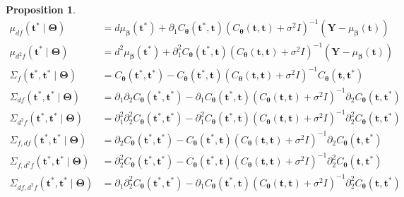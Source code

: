 \documentclass[
  11pt,
]{article}
\newtheorem{proposition}{Proposition}
\theoremstyle{nonumberplain}
\begin{document}
\begin{proposition}
\begin{align*}
  \mu_{df}(\mathbf{t}^\ast \mid \bm{\Theta}) &= d\mu_{\bm{\beta}}(\mathbf{t}^\ast) + \partial_1 C_{\bm{\theta}}(\mathbf{t}^\ast, \mathbf{t})\left(C_{\bm{\theta}}(\mathbf{t}, \mathbf{t}) + \sigma^2 I\right)^{-1}\left(\mathbf{Y} - \mu_{\bm{\beta}}(\mathbf{t})\right) \\
  \mu_{d^2\!f}(\mathbf{t}^\ast \mid \bm{\Theta}) &= d^2\!\mu_{\bm{\beta}}(\mathbf{t}^\ast) + \partial_1^2 C_{\bm{\theta}}(\mathbf{t}^\ast, \mathbf{t})\left(C_{\bm{\theta}}(\mathbf{t}, \mathbf{t}) + \sigma^2 I\right)^{-1}\left(\mathbf{Y} - \mu_{\bm{\beta}}(\mathbf{t})\right)\\
  \Sigma_{f}(\mathbf{t}^\ast, \mathbf{t}^\ast \mid \bm{\Theta}) &= C_{\bm{\theta}}(\mathbf{t}^\ast, \mathbf{t}^\ast) - C_{\bm{\theta}}(\mathbf{t}^\ast, \mathbf{t})\left(C_{\bm{\theta}}(\mathbf{t}, \mathbf{t}) + \sigma^2 I\right)^{-1} C_{\bm{\theta}}(\mathbf{t}, \mathbf{t}^\ast)\\
  \Sigma_{df}(\mathbf{t}^\ast, \mathbf{t}^\ast \mid \bm{\Theta}) &= \partial_1\partial_2C_{\bm{\theta}}(\mathbf{t}^\ast, \mathbf{t}^\ast) - \partial_1C_{\bm{\theta}}(\mathbf{t}^\ast, \mathbf{t})\left(C_{\bm{\theta}}(\mathbf{t}, \mathbf{t}) + \sigma^2 I\right)^{-1} \partial_2C_{\bm{\theta}}(\mathbf{t}, \mathbf{t}^\ast)\\
  \Sigma_{d^2\!f}(\mathbf{t}^\ast, \mathbf{t}^\ast \mid \bm{\Theta}) &= \partial_1^2\partial_2^2 C_{\bm{\theta}}(\mathbf{t}^\ast, \mathbf{t}^\ast) - \partial_1^2 C_{\bm{\theta}}(\mathbf{t}^\ast, \mathbf{t})\left(C_{\bm{\theta}}(\mathbf{t}, \mathbf{t}) + \sigma^2 I\right)^{-1} \partial_2^2 C_{\bm{\theta}}(\mathbf{t}, \mathbf{t}^\ast)\\
  \Sigma_{f, df}(\mathbf{t}^\ast, \mathbf{t}^\ast \mid \bm{\Theta}) &= \partial_2 C_{\bm{\theta}}(\mathbf{t}^\ast, \mathbf{t}^\ast) - C_{\bm{\theta}}(\mathbf{t}^\ast, \mathbf{t})\left(C_{\bm{\theta}}(\mathbf{t}, \mathbf{t}) + \sigma^2 I\right)^{-1} \partial_2 C_{\bm{\theta}}(\mathbf{t}, \mathbf{t}^\ast)\\
  \Sigma_{f, d^2\!f}(\mathbf{t}^\ast, \mathbf{t}^\ast \mid \bm{\Theta}) &= \partial_2^2 C_{\bm{\theta}}(\mathbf{t}^\ast, \mathbf{t}^\ast) - C_{\bm{\theta}}(\mathbf{t}^\ast, \mathbf{t})\left(C_{\bm{\theta}}(\mathbf{t}, \mathbf{t}) + \sigma^2 I\right)^{-1} \partial_2^2 C_{\bm{\theta}}(\mathbf{t}, \mathbf{t}^\ast)\\
  \Sigma_{df, d^2\!f}(\mathbf{t}^\ast, \mathbf{t}^\ast \mid \bm{\Theta}) &= \partial_1 \partial_2^2 C_{\bm{\theta}}(\mathbf{t}^\ast, \mathbf{t}^\ast) - \partial_1 C_{\bm{\theta}}(\mathbf{t}^\ast, \mathbf{t})\left(C_{\bm{\theta}}(\mathbf{t}, \mathbf{t}) + \sigma^2 I\right)^{-1} \partial_2^2 C_{\bm{\theta}}(\mathbf{t}, \mathbf{t}^\ast)
\end{align*}
\label{prop:GPposterior}
\end{proposition}
\end{document}
